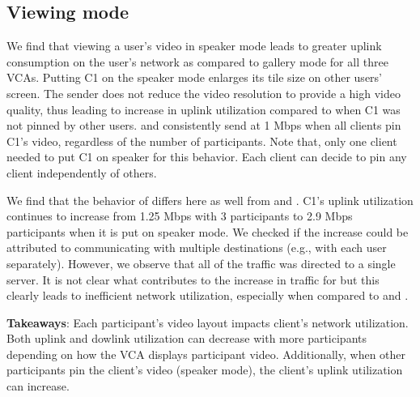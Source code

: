 \subsection{Viewing mode}
We find that viewing a user's video in speaker mode leads to greater uplink consumption on the user's network as compared to gallery mode for all three VCAs. Putting C1 on the speaker mode enlarges its tile size on other users' screen. The sender does not reduce the video resolution to provide a high video quality, thus leading to increase in uplink utilization compared to when C1 was not pinned by other users. \zoom and \meet consistently send at 1 Mbps when all clients pin C1's video, regardless of the number of participants. Note that, only one client needed to put C1 on speaker for this behavior. Each client can decide to pin any client independently of others.

We find that the behavior of \teams differs here as well from \meet and \zoom. C1's uplink utilization continues to increase from 1.25 Mbps with 3 participants to 2.9 Mbps participants when it is put on speaker mode. We checked if the increase could be attributed to \teams communicating with multiple destinations (e.g., with each user separately). However, we observe that all of the traffic was directed to a single server. It is not clear what contributes to the increase in traffic for \teams but this clearly leads to inefficient network utilization, especially when compared to \zoom and \meet. 

\begin{mdframed}[roundcorner=5pt, backgroundcolor=black!10]
\textbf{Takeaways}: Each participant's video layout impacts client's network utilization. Both uplink and dowlink utilization can decrease with more participants depending on how the VCA displays participant video. Additionally, when other participants pin the client's video (speaker mode), the client's uplink utilization can increase. 
\end{mdframed}

